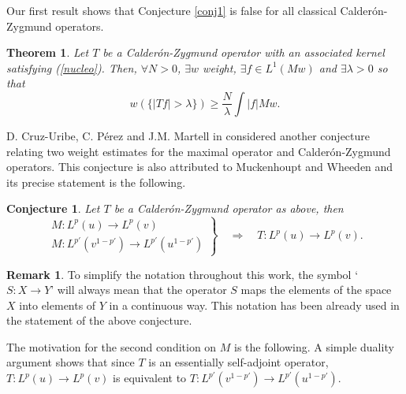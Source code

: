 \documentclass[11pt]{amsart}
\newtheorem{teo}{Theorem}
\newtheorem{conjecture}{Conjecture}
\theoremstyle{definition}
\newtheorem*{xrem}{Remark}
\begin{document}
\bigskip

Our first result shows that Conjecture \ref{conj1} is false for all classical Calder\'on-Zygmund operators.

\bigskip

\begin{teo}\label{no.conj1} Let $T$ be a Calder\'on-Zygmund operator with an associated kernel satisfying (\ref{nucleo}). Then, $\forall N>0$, $\exists w$ weight, $\exists f\in L^1(Mw)$ and $\exists \lambda>0$ so that
\begin{equation}\label{desigualdad.teorema}
w(\{|Tf|>\lambda\})\geq \frac N\lambda\int |f| Mw.
\end{equation}
\end{teo}

\bigskip

D. Cruz-Uribe, C. P\'erez and J.M. Martell in \cite{CUMP3} considered another conjecture relating two weight estimates for the maximal operator and Calder\'on-Zygmund operators. This conjecture is also attributed to Muckenhoupt and Wheeden and its precise statement is the following.

\bigskip

\begin{conjecture}\label{conj2}
Let $T$ be a Calder\'on-Zygmund operator as above, then
\[
\left.\begin{array}{c} M:L^p(u)\rightarrow L^p(v)\\ M:L^{p'}(v^{1-p'})\rightarrow L^{p'}(u^{1-p'})\end{array}\right\}\quad \Longrightarrow \quad T:L^p(u)\rightarrow L^p(v).
\]
\end{conjecture}

\bigskip

\begin{xrem}
To simplify the notation throughout this work, the symbol \lq 
$S:X\rightarrow Y$' will always mean that the operator $S$ maps the elements of the space $X$ into elements of $Y$ in a continuous way. This notation has been already used  in the statement of the above conjecture.
\end{xrem}

\bigskip

The motivation for the second condition on $M$ is the following. A simple duality argument shows that since $T$ is an essentially self-adjoint operator, $T:L^p(u)\rightarrow L^p(v)$ is equivalent to $T:L^{p'}(v^{1-p'})\rightarrow L^{p'}(u^{1-p'})$. 

\bigskip
\end{document}
